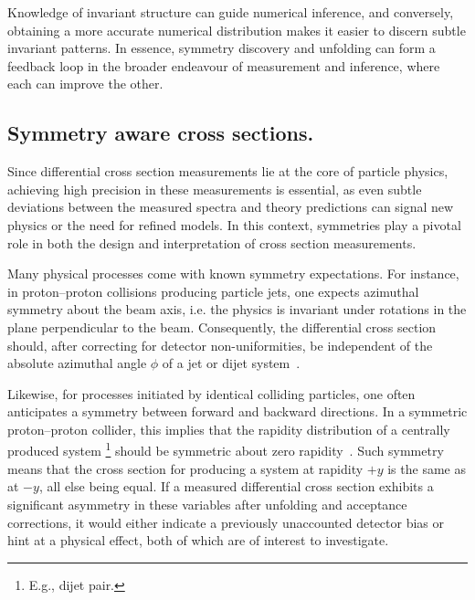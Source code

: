         Knowledge of invariant structure can guide numerical inference, and conversely, obtaining a more accurate numerical distribution makes it easier to discern subtle invariant patterns.
        In essence, symmetry discovery and unfolding can form a feedback loop in the broader endeavour of measurement and inference, where each can improve the other.
        
        \subsection{Symmetry aware cross sections.}
        
        Since differential cross section measurements lie at the core of particle physics,
        achieving high precision in these measurements is essential, as even subtle deviations between the measured spectra and theory predictions can signal new physics or the need for refined models.
        In this context, symmetries play a pivotal role in both the design and interpretation of cross section measurements.

        Many physical processes come with known symmetry expectations.
        For instance, in proton--proton collisions producing particle jets, one expects azimuthal symmetry about the beam axis, i.e. the physics is invariant under rotations in the plane perpendicular to the beam.
        Consequently, the differential cross section should, after correcting for detector non-uniformities, be independent of the absolute azimuthal angle $\phi$ of a jet or dijet system~\cite{Chen:2025rjc, Spinner:2025prg, Pedersen:2023fgr, Froidevaux2009ExperimentalCollider}.

        Likewise, for processes initiated by identical colliding particles, one often anticipates a symmetry between forward and backward directions.
        In a symmetric proton--proton collider, this implies that the rapidity distribution of a centrally produced system \footnote{E.g., dijet pair.} should be symmetric about zero rapidity~\cite{Cheung:2017loo, CMS:2011xqa, Cotogno:2020iio}.
        Such symmetry means that the cross section for producing a system at rapidity $+y$ is the same as at $-y$, all else being equal.
        If a measured differential cross section exhibits a significant asymmetry in these variables after unfolding and acceptance corrections, it would either indicate a previously unaccounted detector bias or hint at a physical effect, both of which are of interest to investigate.
                
